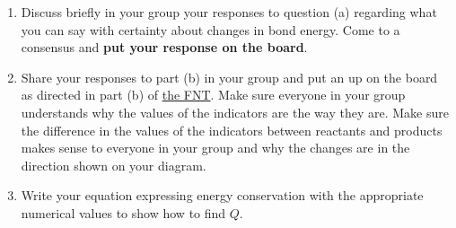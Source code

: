\begin{enumerate}
	\item Discuss briefly in your group your responses to question (a) regarding what you can say with certainty about changes in bond energy. Come to a consensus and \textbf{put your response on the board}.
	
	
	\item Share your responses to part (b) in your group and put an \EnergyDiagram{} up on the board as directed in part (b) of \hyperref[fnt1.1.4-1]{the FNT}. Make sure everyone in your group understands why the values of the indicators are the way they are. Make sure the difference in the values of the indicators between reactants and products makes sense to everyone in your group and why the changes are in the direction shown on your diagram.
	
	
	\item Write your equation expressing energy conservation with the appropriate numerical values to show how to find $Q$.
	
\end{enumerate}

